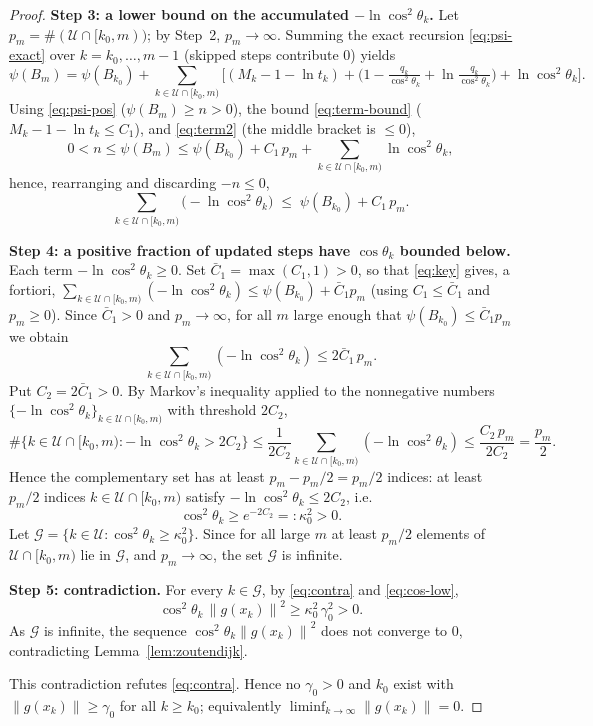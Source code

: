 \documentclass{amsart}
\theoremstyle{definition}
\newcommand{\norm}[1]{\left\lVert #1\right\rVert}
\begin{document}
\begin{proof}
\medskip\noindent\textbf{Step 3: a lower bound on the accumulated
$-\ln\cos^2\theta_k$.}
Let $p_m=\#(\mathcal{U}\cap[k_0,m))$; by Step~2, $p_m\to\infty$. Summing the
exact recursion \eqref{eq:psi-exact} over $k=k_0,\dots,m-1$ (skipped steps
contribute $0$) yields
\[
   \psi(B_m)=\psi(B_{k_0})
   +\!\!\sum_{k\in\mathcal{U}\cap[k_0,m)}\!\!
   \Big[(M_k-1-\ln t_k)
   +\big(1-\tfrac{q_k}{\cos^2\theta_k}+\ln\tfrac{q_k}{\cos^2\theta_k}\big)
   +\ln\cos^2\theta_k\Big].
\]
Using \eqref{eq:psi-pos} ($\psi(B_m)\ge n>0$), the bound \eqref{eq:term-bound}
($M_k-1-\ln t_k\le C_1$), and \eqref{eq:term2} (the middle bracket is $\le0$),
\[
   0<n\le\psi(B_m)\le\psi(B_{k_0})+C_1\,p_m
   +\!\!\sum_{k\in\mathcal{U}\cap[k_0,m)}\!\!\ln\cos^2\theta_k ,
\]
hence, rearranging and discarding $-n\le0$,
\begin{equation}\label{eq:key}
   \sum_{k\in\mathcal{U}\cap[k_0,m)}\big(-\ln\cos^2\theta_k\big)
   \;\le\;\psi(B_{k_0})+C_1\,p_m .
\end{equation}

\medskip\noindent\textbf{Step 4: a positive fraction of updated steps have
$\cos\theta_k$ bounded below.}
Each term $-\ln\cos^2\theta_k\ge0$. Set $\bar C_1=\max(C_1,1)>0$, so that
\eqref{eq:key} gives, a fortiori,
$\sum_{k\in\mathcal{U}\cap[k_0,m)}(-\ln\cos^2\theta_k)\le\psi(B_{k_0})+\bar C_1 p_m$
(using $C_1\le\bar C_1$ and $p_m\ge0$). Since $\bar C_1>0$ and $p_m\to\infty$,
for all $m$ large enough that $\psi(B_{k_0})\le \bar C_1 p_m$ we obtain
\[
   \sum_{k\in\mathcal{U}\cap[k_0,m)}(-\ln\cos^2\theta_k)\le 2\bar C_1\,p_m .
\]
Put $C_2=2\bar C_1>0$. By Markov's inequality applied to the nonnegative numbers
$\{-\ln\cos^2\theta_k\}_{k\in\mathcal{U}\cap[k_0,m)}$ with threshold $2C_2$,
\[
   \#\{k\in\mathcal{U}\cap[k_0,m):-\ln\cos^2\theta_k>2C_2\}
   \le\frac{1}{2C_2}\sum_{k\in\mathcal{U}\cap[k_0,m)}(-\ln\cos^2\theta_k)
   \le\frac{C_2\,p_m}{2C_2}=\frac{p_m}{2}.
\]
Hence the complementary set has at least $p_m-p_m/2=p_m/2$ indices: at least
$p_m/2$ indices $k\in\mathcal{U}\cap[k_0,m)$ satisfy
$-\ln\cos^2\theta_k\le2C_2$, i.e.
\begin{equation}\label{eq:cos-low}
   \cos^2\theta_k\ge e^{-2C_2}=:\kappa_0^2>0 .
\end{equation}
Let $\mathcal{G}=\{k\in\mathcal{U}:\cos^2\theta_k\ge\kappa_0^2\}$. Since for all
large $m$ at least $p_m/2$ elements of $\mathcal{U}\cap[k_0,m)$ lie in
$\mathcal{G}$, and $p_m\to\infty$, the set $\mathcal{G}$ is infinite.

\medskip\noindent\textbf{Step 5: contradiction.} For every $k\in\mathcal{G}$, by
\eqref{eq:contra} and \eqref{eq:cos-low},
\[
   \cos^2\theta_k\,\norm{g(x_k)}^2\ge\kappa_0^2\,\gamma_0^2>0 .
\]
As $\mathcal{G}$ is infinite, the sequence $\cos^2\theta_k\norm{g(x_k)}^2$ does
not converge to $0$, contradicting Lemma~\ref{lem:zoutendijk}.

This contradiction refutes \eqref{eq:contra}. Hence no $\gamma_0>0$ and $k_0$
exist with $\norm{g(x_k)}\ge\gamma_0$ for all $k\ge k_0$; equivalently
$\liminf_{k\to\infty}\norm{g(x_k)}=0$.
\end{proof}
\end{document}
